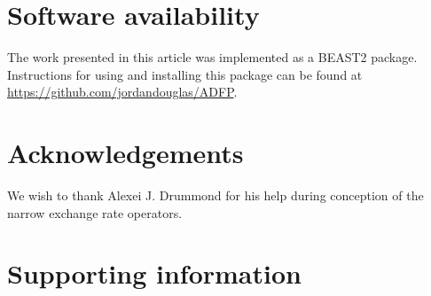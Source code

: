 \documentclass[10pt,letterpaper]{article}
\begin{document}


\section*{Software availability}

The work presented in this article was implemented as a BEAST2 package.
Instructions for using and installing this package can be found at \href{https://github.com/jordandouglas/ADFP}{https://github.com/jordandouglas/ADFP}.



\section*{Acknowledgements}

We wish to thank Alexei J. Drummond for his help during conception of the narrow exchange rate operators.



\section*{Supporting information}
\end{document}
